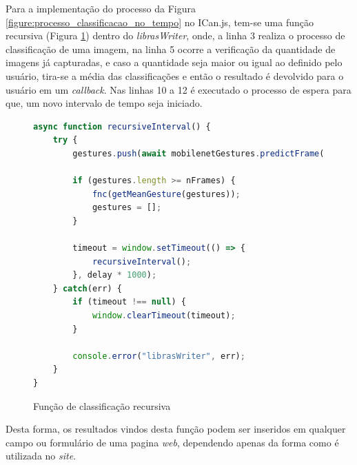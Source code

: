 \par Para a implementação do processo da Figura \ref{figure:processo_classificacao_no_tempo} no ICan.js, tem-se uma função recursiva (Figura \ref{figure:funcao_recursiva_de_classificacao}) dentro do \textit{librasWriter}, onde, a linha 3 realiza o processo de classificação de uma imagem, na linha 5 ocorre a verificação da quantidade de imagens já capturadas, e caso a quantidade seja maior ou igual ao definido pelo usuário, tira-se a média das classificações e então o resultado é devolvido para o usuário em um \textit{callback}. Nas linhas 10 a 12 é executado o processo de espera para que, um novo intervalo de tempo seja iniciado.


\begin{figure}[H]
    \centering
    \caption{Função de classificação recursiva}
    \begin{lstlisting}[language=JavaScript]
async function recursiveInterval() {
    try {
        gestures.push(await mobilenetGestures.predictFrame());

        if (gestures.length >= nFrames) {
            fnc(getMeanGesture(gestures));
            gestures = [];
        }

        timeout = window.setTimeout(() => {
            recursiveInterval();
        }, delay * 1000);       
    } catch(err) {
        if (timeout !== null) {
            window.clearTimeout(timeout);
        }

        console.error("librasWriter", err);
    }
}
    \end{lstlisting}
    \label{figure:funcao_recursiva_de_classificacao}
\end{figure}

\par Desta forma, os resultados vindos desta função podem ser inseridos em qualquer campo ou formulário de uma pagina \textit{web}, dependendo apenas da forma como é utilizada no \textit{site}.


